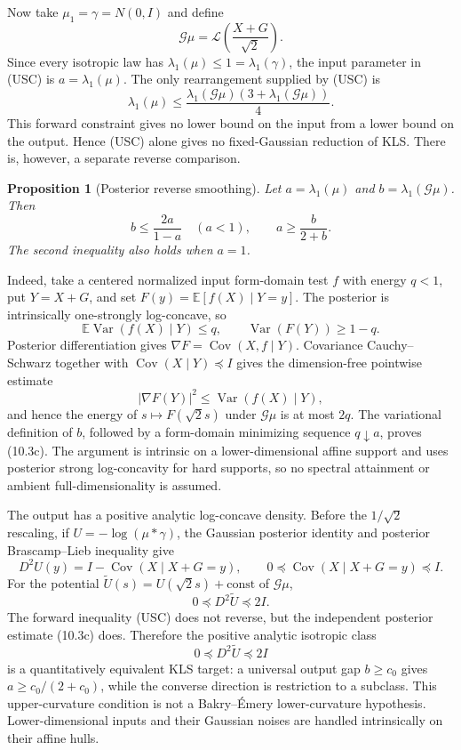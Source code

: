 \documentclass[11pt]{article}
\newtheorem{proposition}[theorem]{Proposition}
\theoremstyle{definition}
\theoremstyle{remark}
\newcommand{\E}{\mathbb E}
\newcommand{\Var}{\operatorname{Var}}
\newcommand{\Cov}{\operatorname{Cov}}
\newcommand{\1}{\mathbf 1}
\begin{document}
Now take \(\mu_1=\gamma=N(0,I)\) and define
\[
 \mathcal G\mu
 =\mathcal L\left(\frac{X+G}{\sqrt2}\right).
\]
Since every isotropic law has
\(\lambda_1(\mu)\le1=\lambda_1(\gamma)\), the input parameter in
(USC) is \(a=\lambda_1(\mu)\).  The only rearrangement supplied by
(USC) is
\[
 \lambda_1(\mu)
 \le\frac{\lambda_1(\mathcal G\mu)
 (3+\lambda_1(\mathcal G\mu))}{4}.                   \tag{10.3a}
\]
This forward constraint gives no lower bound on the input from a lower
bound on the output.  Hence (USC) alone gives no fixed-Gaussian reduction
of KLS.  There is, however, a separate reverse comparison.

\begin{proposition}[Posterior reverse smoothing]
Let
\(a=\lambda_1(\mu)\) and
\(b=\lambda_1(\mathcal G\mu)\).  Then
\[
 \boxed{\qquad
 b\le\frac{2a}{1-a}\quad(a<1),
 \qquad a\ge\frac{b}{2+b}.
 \qquad}                                             \tag{10.3c}
\]
The second inequality also holds when \(a=1\).
\end{proposition}

Indeed, take a centered normalized input form-domain test \(f\) with
energy \(q<1\), put \(Y=X+G\), and set
\(F(y)=\E[f(X)\mid Y=y]\).  The posterior is intrinsically
one-strongly log-concave, so
\[
 \E\Var(f(X)\mid Y)\le q,
 \qquad
 \Var(F(Y))\ge1-q.                                  \tag{10.3d}
\]
Posterior differentiation gives
\(\nabla F=\Cov(X,f\mid Y)\).  Covariance
Cauchy--Schwarz together with
\(\Cov(X\mid Y)\preceq I\) gives the dimension-free pointwise estimate
\[
 |\nabla F(Y)|^2\le\Var(f(X)\mid Y),
\]
and hence the energy of \(s\mapsto F(\sqrt2s)\) under
\(\mathcal G\mu\) is at most \(2q\).  The variational definition of
\(b\), followed by a form-domain minimizing sequence \(q\downarrow a\),
proves (10.3c).  The argument is intrinsic on a lower-dimensional affine
support and uses posterior strong log-concavity for hard supports, so no
spectral attainment or ambient full-dimensionality is assumed.

The output has a positive analytic log-concave density.  Before the
\(1/\sqrt2\) rescaling, if \(U=-\log(\mu*\gamma)\), the Gaussian posterior
identity and posterior Brascamp--Lieb inequality give
\[
 D^2U(y)=I-\Cov(X\mid X+G=y),\qquad
 0\preceq\Cov(X\mid X+G=y)\preceq I.
\]
For the potential \(\widetilde U(s)=U(\sqrt2s)+\mathrm{const}\) of
\(\mathcal G\mu\),
\[
                         0\preceq D^2\widetilde U\preceq2I. \tag{10.3b}
\]
The forward inequality (USC) does not reverse, but the independent
posterior estimate (10.3c) does.  Therefore the positive analytic isotropic
class
\[
                         0\preceq D^2\widetilde U\preceq2I
\]
is a quantitatively equivalent KLS target: a universal output gap
\(b\ge c_0\) gives \(a\ge c_0/(2+c_0)\), while the converse direction is
restriction to a subclass.  This upper-curvature condition is not a
Bakry--\'Emery lower-curvature hypothesis.  Lower-dimensional inputs and
their Gaussian noises are handled intrinsically on their affine hulls.
\end{document}
